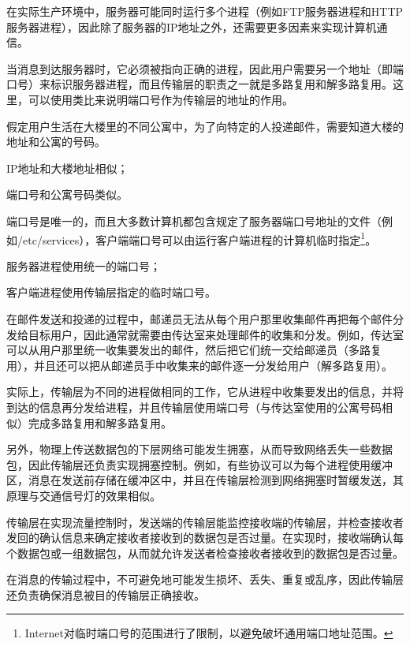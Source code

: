 在实际生产环境中，服务器可能同时运行多个进程（例如FTP服务器进程和HTTP服务器进程），因此除了服务器的IP地址之外，还需要更多因素来实现计算机通信。

当消息到达服务器时，它必须被指向正确的进程，因此用户需要另一个地址（即端口号）来标识服务器进程，而且传输层的职责之一就是多路复用和解多路复用。这里，可以使用类比来说明端口号作为传输层的地址的作用。

假定用户生活在大楼里的不同公寓中，为了向特定的人投递邮件，需要知道大楼的地址和公寓的号码。

\begin{compactitem}
\item IP地址和大楼地址相似；
\item 端口号和公寓号码类似。
\end{compactitem}


端口号是唯一的，而且大多数计算机都包含规定了服务器端口号地址的文件（例如/etc/services），客户端端口号可以由运行客户端进程的计算机临时指定\footnote{Internet对临时端口号的范围进行了限制，以避免破坏通用端口地址范围。}。

\begin{compactitem}
\item 服务器进程使用统一的端口号；
\item 客户端进程使用传输层指定的临时端口号。
\end{compactitem}



在邮件发送和投递的过程中，邮递员无法从每个用户那里收集邮件再把每个邮件分发给目标用户，因此通常就需要由传达室来处理邮件的收集和分发。例如，传达室可以从用户那里统一收集要发出的邮件，然后把它们统一交给邮递员（多路复用），并且还可以把从邮递员手中收集来的邮件逐一分发给用户（解多路复用）。

实际上，传输层为不同的进程做相同的工作，它从进程中收集要发出的信息，并将到达的信息再分发给进程，并且传输层使用端口号（与传达室使用的公寓号码相似）完成多路复用和解多路复用。



另外，物理上传送数据包的下层网络可能发生拥塞，从而导致网络丢失一些数据包，因此传输层还负责实现拥塞控制。例如，有些协议可以为每个进程使用缓冲区，消息在发送前存储在缓冲区中，并且在传输层检测到网络拥塞时暂缓发送，其原理与交通信号灯的效果相似。


传输层在实现流量控制时，发送端的传输层能监控接收端的传输层，并检查接收者发回的确认信息来确定接收者接收到的数据包是否过量。在实现时，接收端确认每个数据包或一组数据包，从而就允许发送者检查接收者接收到的数据包是否过量。

在消息的传输过程中，不可避免地可能发生损坏、丢失、重复或乱序，因此传输层还负责确保消息被目的传输层正确接收。

